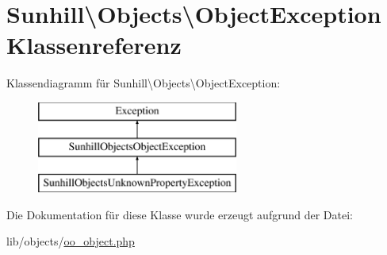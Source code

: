 \hypertarget{classSunhill_1_1Objects_1_1ObjectException}{}\section{Sunhill\textbackslash{}Objects\textbackslash{}Object\+Exception Klassenreferenz}
\label{classSunhill_1_1Objects_1_1ObjectException}
Klassendiagramm für Sunhill\textbackslash{}Objects\textbackslash{}Object\+Exception\+:\begin{figure}[H]
\begin{center}
\leavevmode
\includegraphics[height=3.000000cm]{da/dab/classSunhill_1_1Objects_1_1ObjectException}
\end{center}
\end{figure}


Die Dokumentation für diese Klasse wurde erzeugt aufgrund der Datei\+:\begin{DoxyCompactItemize}
\item 
lib/objects/\hyperlink{oo__object_8php}{oo\+\_\+object.\+php}\end{DoxyCompactItemize}
